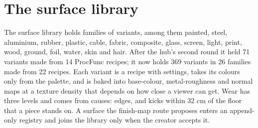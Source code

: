 \section{The surface library}\label{the-surface-library}

The surface library holds families of variants, among them painted, steel, aluminium, rubber, plastic, cable, fabric, composite, glass, screen, light, print, wood, ground, foil, water, skin and hair. After the hub's second round it held 71 variants made from 14 ProcFunc recipes; it now holds 369 variants in 26 families made from 22 recipes. Each variant is a recipe with settings, takes its colours only from the palette, and is baked into base-colour, metal-roughness and normal maps at a texture density that depends on how close a viewer can get. Wear has three levels and comes from causes: edges, and kicks within 32 cm of the floor that a piece stands on. A surface the finish-map route proposes enters an append-only registry and joins the library only when the creator accepts it.
